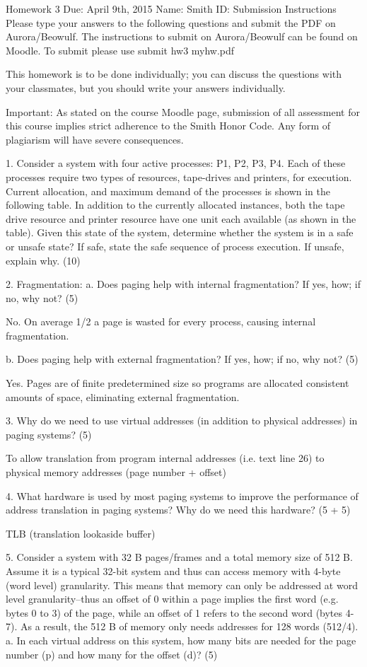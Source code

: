Homework 3
Due: April 9th, 2015
Name:			Smith ID:
Submission Instructions
Please type your answers to the following questions and submit the PDF on Aurora/Beowulf. The instructions to submit on Aurora/Beowulf can be found on Moodle.  To submit please use submit hw3 myhw.pdf

This homework is to be done individually; you can discuss the questions with your classmates, but you should write your answers individually.

Important: As stated on the course Moodle page, submission of all assessment for this course implies strict adherence to the Smith Honor Code. Any form of plagiarism will have severe consequences. 

1. Consider a system with four active processes: P1, P2, P3, P4. Each of these processes require two types of resources, tape-drives and printers, for execution. Current allocation, and maximum demand of the processes is shown in the following table. In addition to the currently allocated instances, both the tape drive resource and printer resource have one unit each available (as shown in the table). Given this state of the system, determine whether the system is in a safe or unsafe state? If safe, state the safe sequence of process execution. If unsafe, explain why. (10)



2. Fragmentation:
a. Does paging help with internal fragmentation? If yes, how; if no, why not? (5)

No. On average 1/2 a page is wasted for every process, causing internal fragmentation.

b. Does paging help with external fragmentation? If yes, how; if no, why not? (5)

Yes. Pages are of finite predetermined size so programs are allocated consistent amounts of space, eliminating external fragmentation.

3. Why do we need to use virtual addresses (in addition to physical addresses) in paging systems? (5)

To allow translation from program internal addresses (i.e. text line 26) to physical memory addresses (page number + offset)

4. What hardware is used by most paging systems to improve the performance of address translation in paging systems? Why do we need this hardware? (5 + 5)

TLB (translation lookaside buffer)

5. Consider a system with 32 B pages/frames and a total memory size of 512 B. Assume it is a typical 32-bit system and thus can access memory with 4-byte (word level) granularity. This means that memory can only be addressed at word level granularity--thus an offset of 0 within a page implies the first word (e.g. bytes 0 to 3) of the page, while an offset of 1 refers to the second word (bytes 4-7). As a result, the 512 B of memory only needs addresses for 128 words (512/4).
a. In each virtual address on this system, how many bits are needed for the page number (p) and how many for the offset (d)? (5) 

